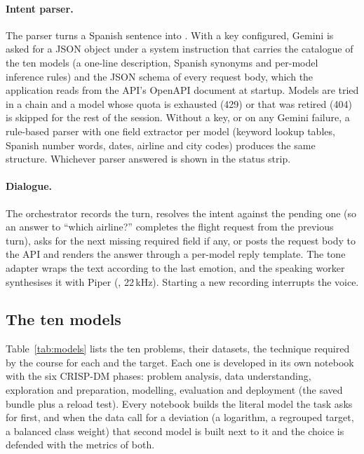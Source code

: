 \paragraph{Intent parser.}
The parser turns a Spanish sentence into
. With a key configured, Gemini is asked
for a JSON object under a system instruction that carries the catalogue of
the ten models (a one-line description, Spanish synonyms and per-model
inference rules) and the JSON schema of every request body, which the
application reads from the API's OpenAPI document at startup. Models are
tried in a chain and a model whose quota is exhausted (429) or that was
retired (404) is skipped for the rest of the session. Without a key, or on
any Gemini failure, a rule-based parser with one field extractor per model
(keyword lookup tables, Spanish number words, dates, airline and city codes)
produces the same structure. Whichever parser answered is shown in the
status strip.

\paragraph{Dialogue.}
The orchestrator records the turn, resolves the intent against the pending
one (so an answer to ``which airline?'' completes the flight request from
the previous turn), asks for the next missing required field if any, or
posts the request body to the API and renders the answer through a per-model
reply template. The tone adapter wraps the text according to the last
emotion, and the speaking worker synthesises it with Piper
(, 22\,kHz). Starting a new recording interrupts the
voice.

\subsection{The ten models}

Table~\ref{tab:models} lists the ten problems, their datasets, the technique
required by the course for each and the target. Each one is developed in
its own notebook with the six CRISP-DM phases: problem
analysis, data understanding, exploration and preparation, modelling,
evaluation and deployment (the saved bundle plus a reload test). Every
notebook builds the literal model the task asks for first, and when the data
call for a deviation (a logarithm, a regrouped target, a balanced class
weight) that second model is built next to it and the choice is defended
with the metrics of both.

